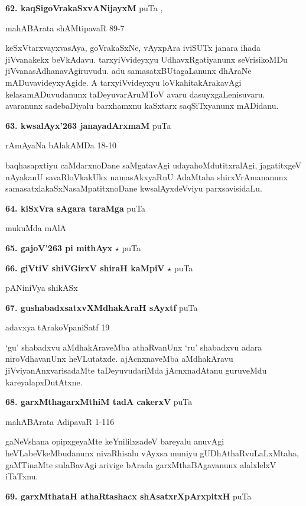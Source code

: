 \medskip
\noindent\textbf{62. kaqSigoVrakaSxvANijayxM} \hfill puTa \pageref{75},\pageref{225a}

\hfill mahABArata shAMtipavaR 89-7

keSxVtarxvayxvasAya, goVrakaSxNe, vAyxpAra iviSUTx janara ihada jiVvanakekx beVkAdavu. tarxyiVvideyxyu UdhavxRgatiyanunx seVrisikoMDu jiVvanasAdhanavAgiruvudu. adu samasatxBUtagaLanunx dhAraNe mADuvavideyxyAgide. A tarxyiVvideyxyu loVkahitakArakavAgi kelasamADuvudanunx taDeyuvarAruMToV avaru dasuyxgaLenisuvaru. avaranunx sadebaDiyalu barxhamxnu kaSxtarx saqSiTxyanunx mADidanu.

\medskip
\noindent\textbf{63. kwsalAyx\char'263  janayadArxmaM} \hfill puTa \pageref{252}

\hfill rAmAyaNa bAlakAMDa 18-10

baqhasapxtiyu caMdarxnoDane saMgatavAgi udayahoMdutitxralAgi, jagatitxgeV nAyakanU savaRloVkakUkx namasAkxyaRnU AdaMtaha shirxVrAmananunx samasatxlakaSxNasaMpatitxnoDane kwsalAyxdeVviyu parxsavisidaLu.

\medskip
\noindent\textbf{64. kiSxVra sAgara taraMga} \hfill puTa \pageref{147}

\hfill mukuMda mAlA

\medskip
\noindent\textbf{65. gajoV\char'263 pi mithAyx} $\star$ \hfill puTa \pageref{54}

\medskip
\noindent\textbf{66. giVtiV shiVGirxV shiraH kaMpiV} $\star$ \hfill puTa \pageref{5}

\hfill pANiniVya shikASx
 
\medskip
\noindent\textbf{67. gushabadxsatxvXMdhakAraH sAyxtf} \hfill puTa \pageref{98a}

\hfill adavxya tArakoVpaniSatf 19

`gu' shabadxvu aMdhakAraveMba athaRvanUnx `ru' shabadxvu adara niroVdhavanUnx heVLutatxde. ajAcnxnaveMba aMdhakAravu jiVviyanAnxvarisadaMte taDeyuvudariMda jAcnxnadAtanu guruveMdu kareyalapxDutAtxne.

\medskip
\noindent\textbf{68. garxMthagarxMthiM tadA cakerxV} \hfill puTa \pageref{119}

\hfill mahABArata AdipavaR 1-116

gaNeVshana opipxgeyaMte keYnililxsadeV bareyalu anuvAgi heVLabeVkeMbudanunx nivaRhisalu vAyxsa muniyu gUDhAthaRvuLaLxMtaha, gaMTinaMte sulaBavAgi arivige bArada garxMthaBAgavanunx alalxlelxV iTaTxnu.

\medskip
\noindent\textbf{69. garxMthataH athaRtashacx shAsatxrXpArxpitxH} \hfill puTa \pageref{105}

